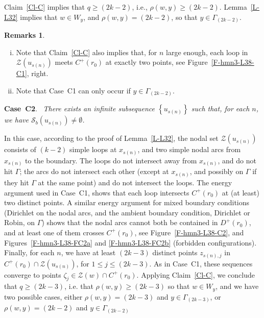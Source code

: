 \documentclass[12pt,a4paper]{amsart}
\theoremstyle{plain} %
\theoremstyle{definition}
\newtheorem{remarks}[theorem]{Remarks}
\numberwithin{equation}{section}
\numberwithin{figure}{section}
\numberwithin{table}{section}
\newcommand{\cS}{\mathcal{S}}
\newcommand{\cZ}{\mathcal{Z}}
\newcommand{\set}[1]{\left\lbrace #1 \right\rbrace}
\newcommand{\noi}{\noindent}
\begin{document}
Claim~\ref{Cl-C} implies that $q \ge (2k-2)$, i.e., $\rho(w,y) \ge (2k-2)$. Lemma~\ref{L-L32} implies that $w \in W_y$, and $\rho(w,y) = (2k-2)$, so that $y \in \Gamma_{(2k-2)}$.


\begin{remarks}\label{R-L38-4}\phantom{}
\begin{enumerate}[(i)]
  \item Note that Claim~\ref{Cl-C} also implies that, for $n$ large enough, each loop in $\cZ(u_{s(n)})$ meets $C^{+}(r_0)$ at exactly two points,  see Figure~\ref{F-hmn3-L38-C1}, right.
  \item Note that Case~C1 can only occur if $y \in \Gamma_{(2k-2)}$.
\end{enumerate}
\end{remarks}%
\medskip

\noi \textbf{Case~C2}.~ \emph{There exists an infinite subsequence $\set{u_{s(n)}}$ such that, for each $n$, we have $\cS_b (u_{s(n)}) \neq \emptyset$.}\smallskip

In this case, according to the proof of Lemma~\ref{L-L32},
 the nodal set $\cZ(u_{s(n)})$ consists of $(k -2)$ simple loops at $x_{s(n)}$, and two simple nodal arcs from $x_{s(n)}$ to the boundary.
 The loops do not intersect away from $x_{s(n)}$, and do not hit $\Gamma $; the arcs do not intersect each other (except at $x_{s(n)}$, and possibly on $\Gamma $ if they hit $\Gamma $  at the same point) and do not intersect the loops. The energy argument used in Case~C1, shows that each loop intersects $C^{+}(r_0)$ at (at least) two distinct points.
  A similar energy argument for mixed boundary conditions (Dirichlet on the nodal arcs, and the ambient boundary condition, Dirichlet or Robin, on $\Gamma $) shows that the nodal arcs cannot both be contained in $D^{+}(r_0)$,
  and at least one of them crosses $C^{+}(r_0)$, see %
 Figure~\ref{F-hmn3-L38-C2}, and Figures~\ref{F-hmn3-L38-FC2a} and \ref{F-hmn3-L38-FC2b} (forbidden configurations).  Finally, for each $n$, we have at least $(2k-3)$   distinct points $z_{s(n),j}$ in $C^{+}(r_0) \cap \cZ(u_{s(n)})$, for $1 \le j \le (2k-3)$.   As in Case~C1, these sequences converge to points $\zeta_j \in \cZ(w) \cap C^{+}(r_0)$. Applying Claim~\ref{Cl-C}, we conclude that $q \ge (2k-3)$, i.e. that $\rho(w,y) \ge (2k-3)$ so that $w \in W_y$, and we have two possible cases, either $\rho(w,y) = (2k-3)$ and $y \in \Gamma_{(2k-3)}$, or
$\rho(w,y) = (2k-2)$ and $y \in \Gamma_{(2k-2)}$ \smallskip
\end{document}
